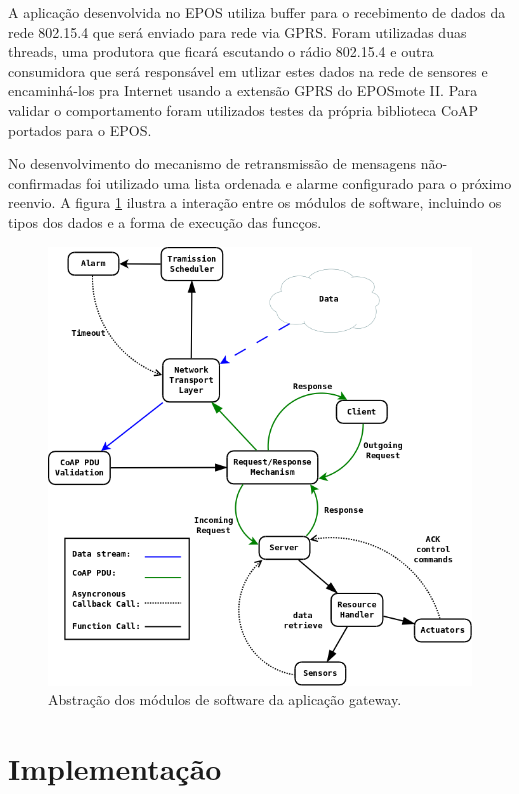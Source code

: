 A aplica\c{c}\~ao desenvolvida no EPOS utiliza buffer para o recebimento de dados da rede 802.15.4 que ser\'a enviado para rede via GPRS. Foram utilizadas duas threads, uma produtora que ficar\'a escutando o r\'adio 802.15.4 e outra consumidora que ser\'a respons\'avel em utlizar estes dados na rede de sensores e encaminh\'a-los pra Internet usando a extens\~ao GPRS do EPOSmote II. Para validar o comportamento foram utilizados testes da pr\'opria biblioteca CoAP portados para o EPOS.

No desenvolvimento do mecanismo de retransmiss\~ao de mensagens n\~ao-confirmadas foi utilizado uma lista ordenada e alarme configurado para o pr\'oximo reenvio. A figura \ref{diagramaSequenciaCoapClient} ilustra a intera\c{c}\~ao entre os m\'odulos de software, incluindo os tipos dos dados e a forma de execu\c{c}\~ao das func\c{c}os.

\begin{figure}[H]
   \centering
   \includegraphics[width=1.0\textwidth]{figuras/coap.png}
   \caption{Abstra\c{c}\~ao dos m\'odulos de software da aplica\c{c}\~ao gateway.}
   \label{diagramaSequenciaCoapClient}
\end{figure}


\section{Implementa\c{c}\~ao}

